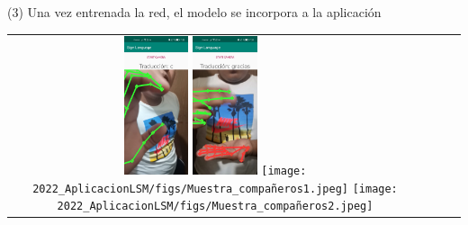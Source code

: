 \begin{frame}{ (3)}
Una vez entrenada la red, el modelo se incorpora a la aplicación
\begin{center}
 \begin{tabular}{cccc}
    \includegraphics[width=0.16\textwidth]{2022_AplicacionLSM/figs/App1.jpeg}
    \includegraphics[width=0.16\textwidth]{2022_AplicacionLSM/figs/App2.jpeg}
    \texttt{[image: 2022\_AplicacionLSM/figs/Muestra\_compañeros1.jpeg]}
    \texttt{[image: 2022\_AplicacionLSM/figs/Muestra\_compañeros2.jpeg]}
  \end{tabular}
\end{center}

\end{frame}






